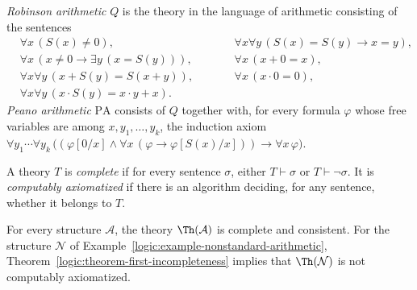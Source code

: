 \begin{definition}\label{logic:definition-arithmetic}
\emph{Robinson arithmetic} $Q$ is the theory in the language of arithmetic
consisting of the sentences
\[
\begin{aligned}
& \forall x\, (S(x) \neq 0), \qquad && \forall x \forall y\, (S(x) = S(y) \to x = y), \\
& \forall x\, (x \neq 0 \to \exists y\, (x = S(y))), \qquad && \forall x\, (x + 0 = x), \\
& \forall x \forall y\, (x + S(y) = S(x + y)), \qquad && \forall x\, (x \cdot 0 = 0), \\
& \forall x \forall y\, (x \cdot S(y) = x \cdot y + x).
\end{aligned}
\]
\emph{Peano arithmetic} $\mathrm{PA}$ consists of $Q$ together with, for every
formula $\varphi$ whose free variables are among $x, y_1, \ldots, y_k$, the
induction axiom
$\forall y_1 \cdots \forall y_k\, \bigl((\varphi[0/x] \wedge \forall x\,(\varphi \to \varphi[S(x)/x])) \to \forall x\,\varphi\bigr)$.
\end{definition}

\begin{definition}\label{logic:definition-complete-theory}
A theory $T$ is \emph{complete} if for every sentence $\sigma$, either
$T \vdash \sigma$ or $T \vdash \neg\sigma$. It is \emph{computably axiomatized}
if there is an algorithm deciding, for any sentence, whether it belongs to
$T$.
\end{definition}

\begin{example}\label{logic:example-complete-theory}
For every structure $\mathcal{A}$, the theory $\Th(\mathcal{A})$ is complete
and consistent. For the structure $\mathcal{N}$ of
Example~\ref{logic:example-nonstandard-arithmetic},
Theorem~\ref{logic:theorem-first-incompleteness} implies that
$\Th(\mathcal{N})$ is not computably axiomatized.
\end{example}

